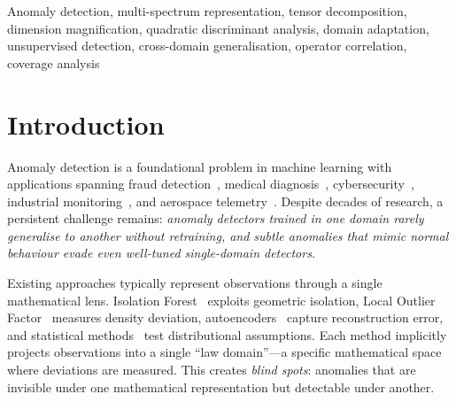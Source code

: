 \documentclass[journal]{IEEEtran}
\begin{document}
\begin{abstract}
We validate on five datasets spanning four domains with a single set of hyperparameters and no per-domain tuning, achieving perfect separation (AUC $= 1.000$) on both standard and camouflage-mimicking anomalies. Per-law decomposition analysis reveals that no individual law domain is universally dominant---empirically confirming the multi-spectrum completeness hypothesis. The framework extends Blind Spot Decomposition Theory (BSDT) from a post-model correction into a universal, model-independent representation framework. An open-source Python implementation is provided.
\end{abstract}

\begin{IEEEkeywords}
Anomaly detection, multi-spectrum representation, tensor decomposition, dimension magnification, quadratic discriminant analysis, domain adaptation, unsupervised detection, cross-domain generalisation, operator correlation, coverage analysis
\end{IEEEkeywords}

\section{Introduction}
\label{sec:introduction}

Anomaly detection is a foundational problem in machine learning with applications spanning fraud detection~\cite{ahmed2016survey}, medical diagnosis~\cite{fernando2021deep}, cybersecurity~\cite{chandola2009anomaly}, industrial monitoring~\cite{pang2021deep}, and aerospace telemetry~\cite{hundman2018detecting}. Despite decades of research, a persistent challenge remains: \textit{anomaly detectors trained in one domain rarely generalise to another without retraining, and subtle anomalies that mimic normal behaviour evade even well-tuned single-domain detectors.}

Existing approaches typically represent observations through a single mathematical lens. Isolation Forest~\cite{liu2008isolation} exploits geometric isolation, Local Outlier Factor~\cite{breunig2000lof} measures density deviation, autoencoders~\cite{an2015variational} capture reconstruction error, and statistical methods~\cite{chandola2009anomaly} test distributional assumptions. Each method implicitly projects observations into a single ``law domain''---a specific mathematical space where deviations are measured. This creates \textit{blind spots}: anomalies that are invisible under one mathematical representation but detectable under another.
\end{document}
